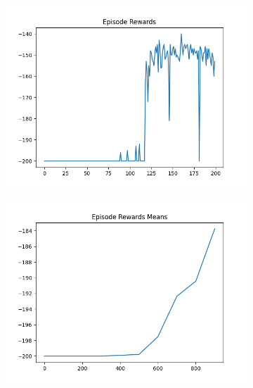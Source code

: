 \begin{figure}[H]
    \centering
    \begin{subfigure}{.47\linewidth}
        \centering
        \includegraphics[width=\textwidth]{mountain/2024-06-15_13-39-22_dqn_mountaincar_episode_rewards.png}
    \end{subfigure}
    \begin{subfigure}{.47\linewidth}
        \centering
        \includegraphics[width=\textwidth]{mountain/2024-06-15_11-57-24_dqn_mountaincar_episode_rewards_means.png}
    \end{subfigure}
    \begin{subfigure}{.47\linewidth}
        \centering

\end{subfigure}
\end{figure}
